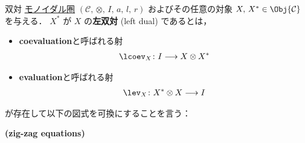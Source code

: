 \documentclass[TQFT_main]{subfiles}
\begin{document}

\begin{mydef}[label=def:dual,breakable]{双対}
    \hyperref[def:monoidal-category]{モノイダル圏} $(\mathcal{C},\, \otimes,\, I,\, a,\, l,\, r)$ およびその任意の対象 $X,\, X^* \in \Obj{\mathcal{C}}$ を与える．
    $X^*$ が $X$ の\textbf{左双対} (left dual) であるとは，
    \begin{itemize}
        \item \textbf{coevaluation}と呼ばれる射
        \begin{align}
            \lcoev_X \colon I \lto X \otimes X^*
        \end{align}
        \item \textbf{evaluation}と呼ばれる射
        \begin{align}
            \lev_X \colon X^* \otimes X \lto I
        \end{align}
    \end{itemize}
    が存在して以下の図式を可換にすることを言う：
    \begin{description}
        \item[\textbf{(zig-zag equations)}]　
        
        \begin{center}
        \end{center}

        \begin{center}
        \end{center}
    \end{description}
    \tcblower


\end{mydef}
\end{document}
